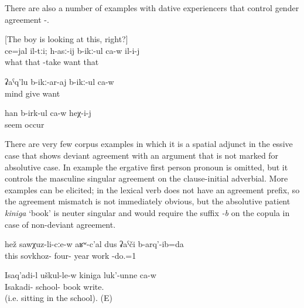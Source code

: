 There are also a number of examples with dative experiencers that control gender agreement -.
%
\begin{exe}
	\ex	\label{ex:Maybe these, he wants to take} [‎The boy is looking at this, right?]\\
	\gll	ce=jal	il-tːi;	h-asː-ij	b-ikː-ul	ca-w	il-i-j\\
		what	that	-take	want		that	\\
	\glt	{}

	\ex	\label{ex:wants to give him knowledge}
	\gll	ʡaˁq'lu	b-ikː-ar-aj	b-ikː-ul	ca-w\\
		mind	give		want	\\
	\glt	{}

	\ex	\label{ex:bring those years back now}
	\gll	han	b-irk-ul	ca-w	heχ-i-j\\
		seem	occur		\\
	\glt	{} 
\end{exe}

There are very few corpus examples in which it is a spatial adjunct in the essive case that shows deviant agreement with an argument that is not marked for absolutive case. In example  the ergative first person pronoun is omitted, but it controls the masculine singular agreement on the clause-initial adverbial. More examples can be elicited; in  the lexical verb does not have an agreement prefix, so the agreement mismatch is not immediately obvious, but the absolutive patient \textit{kiniga} `book' is neuter singular and would require the suffix \textit{-b} on the copula in case of non-deviant agreement.

\begin{exe}
	\ex	\label{ex:In the sovkhoz I worked for 40 years.}
	\gll	hež	sawχuz-li-cːe-w	aʁʷ-c'al	dus	ʡaˁči	b-arq'-ib=da\\
			this	sovkhoz-	four-	year	work	-do.=1\\
		\glt	{}
		
			\ex	\label{ex:Isakadi is writing a book in the school.}
	\gll	Isaq'adi-l	uškul-le-w	kiniga	luk'-unne	ca-w\\
		Isakadi-	school-	book	write.		\\
	\glt	{} (i.e. sitting in the school). (E)
\end{exe}

